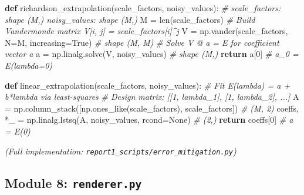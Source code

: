 \documentclass[
  11pt,
]{report}
\newenvironment{Shaded}{}{}
\newcommand{\BuiltInTok}[1]{\textcolor[rgb]{0.00,0.50,0.00}{#1}}
\newcommand{\CommentTok}[1]{\textcolor[rgb]{0.38,0.63,0.69}{\textit{#1}}}
\newcommand{\ControlFlowTok}[1]{\textcolor[rgb]{0.00,0.44,0.13}{\textbf{#1}}}
\newcommand{\DecValTok}[1]{\textcolor[rgb]{0.25,0.63,0.44}{#1}}
\newcommand{\KeywordTok}[1]{\textcolor[rgb]{0.00,0.44,0.13}{\textbf{#1}}}
\newcommand{\NormalTok}[1]{#1}
\newcommand{\OperatorTok}[1]{\textcolor[rgb]{0.40,0.40,0.40}{#1}}
\newcommand{\VariableTok}[1]{\textcolor[rgb]{0.10,0.09,0.49}{#1}}
\begin{document}
\begin{Shaded}
\begin{Highlighting}[]
\KeywordTok{def}\NormalTok{ richardson\_extrapolation(scale\_factors, noisy\_values):}
    \CommentTok{\# scale\_factors: shape (M,)   noisy\_values: shape (M,)}
\NormalTok{    M }\OperatorTok{=} \BuiltInTok{len}\NormalTok{(scale\_factors)}
    \CommentTok{\# Build Vandermonde matrix V[i, j] = scale\_factors[i]\^{}j}
\NormalTok{    V }\OperatorTok{=}\NormalTok{ np.vander(scale\_factors, N}\OperatorTok{=}\NormalTok{M, increasing}\OperatorTok{=}\VariableTok{True}\NormalTok{)  }\CommentTok{\# shape (M, M)}
    \CommentTok{\# Solve V @ a = E for coefficient vector a}
\NormalTok{    a }\OperatorTok{=}\NormalTok{ np.linalg.solve(V, noisy\_values)                }\CommentTok{\# shape (M,)}
    \ControlFlowTok{return}\NormalTok{ a[}\DecValTok{0}\NormalTok{]                           }\CommentTok{\# a\_0 = E(lambda=0)}


\KeywordTok{def}\NormalTok{ linear\_extrapolation(scale\_factors, noisy\_values):}
    \CommentTok{\# Fit E(lambda) = a + b*lambda via least{-}squares}
    \CommentTok{\# Design matrix: [[1, lambda\_1], [1, lambda\_2], ...]}
\NormalTok{    A }\OperatorTok{=}\NormalTok{ np.column\_stack([np.ones\_like(scale\_factors), scale\_factors])  }\CommentTok{\# (M, 2)}
\NormalTok{    coeffs, }\OperatorTok{*}\NormalTok{\_ }\OperatorTok{=}\NormalTok{ np.linalg.lstsq(A, noisy\_values, rcond}\OperatorTok{=}\VariableTok{None}\NormalTok{)        }\CommentTok{\# (2,)}
    \ControlFlowTok{return}\NormalTok{ coeffs[}\DecValTok{0}\NormalTok{]                      }\CommentTok{\# a = E(0)}
\end{Highlighting}
\end{Shaded}

\emph{(Full implementation:
\texttt{report1\_scripts/error\_mitigation.py})}

\subsection{\texorpdfstring{Module 8:
\texttt{renderer.py}}{Module 8: renderer.py}}\label{module-8-renderer.py}
\end{document}
